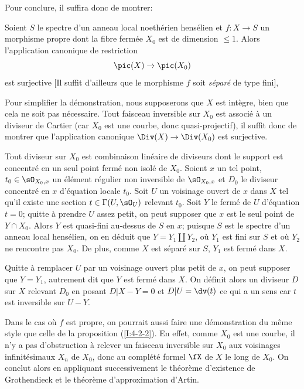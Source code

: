 Pour conclure, il suffira donc de montrer:





\begin{propositiondotdash}\label{I:4-4-1}
Soient $S$ le spectre d'un anneau local noethérien hensélien et $f:X\to S$ 
un morphisme propre dont la fibre fermée $X_0$ est de dimension 
$\leqslant 1$. Alors l'application canonique de restriction 
\[
  \pic(X)\to \pic(X_0)
\]
est surjective [Il suffit d'ailleurs que le morphisme $f$ soit 
\emph{séparé} de type fini], 
\end{propositiondotdash}

Pour simplifier la démonstration, nous supposerons que $X$ est intègre, 
bien que cela ne soit pas nécessaire. Tout faisceau inversible sur $X_0$ est 
associé à un diviseur de Cartier (car $X_0$ est une courbe, donc 
quasi-projectif), il suffit donc de montrer que l'application canonique 
$\Div(X)\to\Div(X_0)$ est surjective. 

Tout diviseur sur $X_0$ est combinaison linéaire de diviseurs dont le 
support est concentré en un seul point fermé non isolé de $X_0$. Soient 
$x$ un tel point, $t_0\in\sO_{X_0,x}$ un élément régulier non inversible 
de $\sO_{X_0,x}$ et $D_0$ le diviseur concentré en $x$ d'équation locale 
$t_0$. Soit $U$ un voisinage ouvert de $x$ dans $X$ tel qu'il existe une section 
$t\in \Gamma(U,\sO_U)$ relevant $t_0$. Soit $Y$ le fermé de $U$ d'équation 
$t=0$; quitte à prendre $U$ assez petit, on peut supposer que $x$ est le 
seul point de $Y\cap X_0$. Alors $Y$ est quasi-fini au-dessus de $S$ en $x$; 
puisque $S$ est le spectre d'un anneau local hensélien, on en déduit que 
$Y=Y_1\amalg Y_2$, où $Y_1$ est fini sur $S$ et où $Y_2$ ne rencontre pas 
$X_0$. De plus, comme $X$ est séparé sur $S$, $Y_1$ est fermé dans $X$. 

Quitte à remplacer $U$ par un voisinage ouvert plus petit de $x$, on peut 
supposer que $Y=Y_1$, autrement dit que $Y$ est fermé dans $X$. On définit 
alors un diviseur $D$ sur $X$ relevant $D_0$ en posant $D|X-Y=0$ et 
$D|U=\dv(t)$ ce qui a un sens car $t$ est inversible sur $U-Y$. 





\begin{sourceexampledotdash}[Remarque]\label{I:4-4-2}

Dans le cas où $f$ est propre, on pourrait aussi faire une démonstration 
du même style que celle de la proposition (\ref{I:4-2-2}). En effet, comme 
$X_0$ est une courbe, il n'y a pas d'obstruction à relever un faisceau 
inversible sur $X_0$ aux voisinages infinitésimaux $X_n$ de $X_0$, donc au 
complété formel $\fX$ de $X$ le long de $X_0$. On conclut alors en 
appliquant successivement le théorème d'existence de Grothendieck et le 
théorème d'approximation d'Artin. 
\end{sourceexampledotdash}










